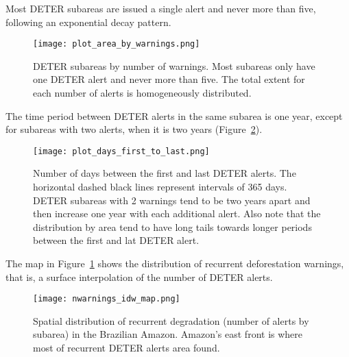 Most DETER subareas are issued a single alert and never more than five, following an exponential decay pattern.

\begin{figure}[h] 
    \begin{center}
    \texttt{[image: plot\_area\_by\_warnings.png]}
    \caption{DETER subareas by number of warnings. Most subareas only have one
        DETER alert and never more than five. The total extent for each number
        of alerts is homogeneously distributed.}
    \label{fig:plot_area_by_warnings}
    \end{center}
\end{figure}

%

The time period between DETER alerts in the same subarea is one year, except for subareas with two alerts, when it is two years (Figure~\ref{fig:plot_days_first_to_last}). 

\begin{figure}[h] 
    \begin{center}
        \texttt{[image: plot\_days\_first\_to\_last.png]}
    \caption{Number of days between the first and last DETER alerts. The
        horizontal dashed black lines represent intervals of 365 days.
        DETER subareas with 2 warnings tend to be two years apart and then
        increase one year with each additional alert. Also note that the
        distribution by area tend to have long tails towards longer periods
        between the first and lat DETER alert.}
    \label{fig:plot_days_first_to_last}
    \end{center}
\end{figure}

The map in Figure~\ref{fig:plot_area_by_warnings} shows the distribution of recurrent deforestation warnings, that is, a surface interpolation of the number of DETER alerts.

\begin{figure}[h] 
    \begin{center}
        \texttt{[image: nwarnings\_idw\_map.png]}
        \caption{Spatial distribution of recurrent degradation (number of
        alerts by subarea) in the Brazilian Amazon. Amazon's east front is
        where most of recurrent DETER alerts area found.}
    \label{fig:nwarnings_idw_map}
    \end{center}
\end{figure}
